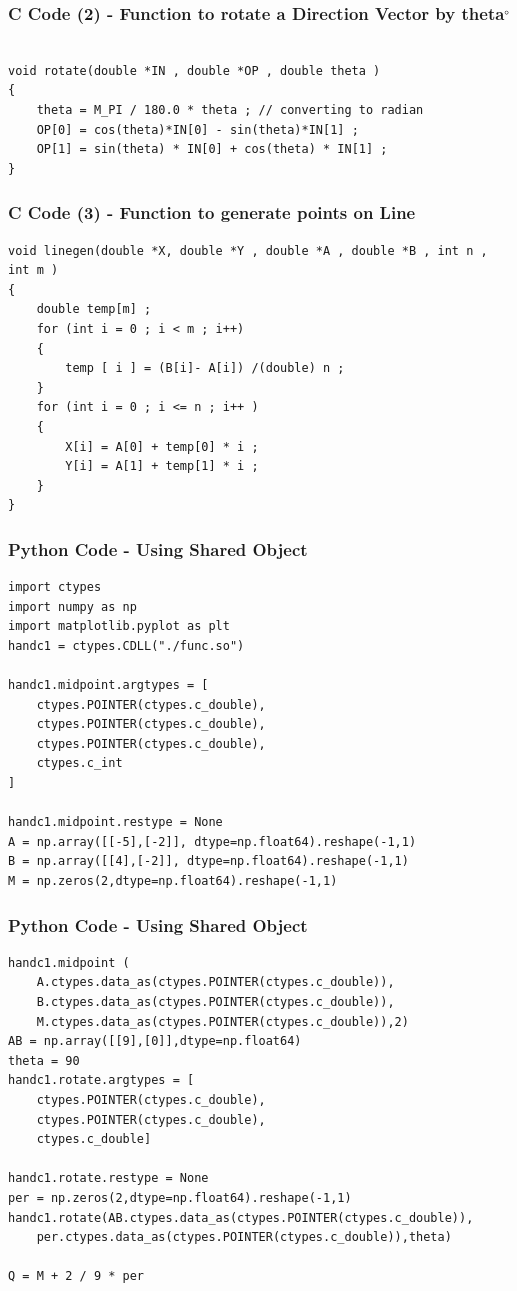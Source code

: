 \documentclass{beamer}
\begin{document}
\begin{frame}[fragile]
    \frametitle{C Code (2) - Function to rotate a Direction Vector by theta$\degree$}
    \begin{lstlisting}

void rotate(double *IN , double *OP , double theta )
{
    theta = M_PI / 180.0 * theta ; // converting to radian
    OP[0] = cos(theta)*IN[0] - sin(theta)*IN[1] ; 
    OP[1] = sin(theta) * IN[0] + cos(theta) * IN[1] ; 
}

    \end{lstlisting}
\end{frame}



\begin{frame}[fragile]
    \frametitle{C Code (3) - Function to generate points on Line }
    \begin{lstlisting}
void linegen(double *X, double *Y , double *A , double *B , int n , int m )
{
    double temp[m] ; 
    for (int i = 0 ; i < m ; i++)
    {
        temp [ i ] = (B[i]- A[i]) /(double) n ; 
    }
    for (int i = 0 ; i <= n ; i++ )
    {
        X[i] = A[0] + temp[0] * i ; 
        Y[i] = A[1] + temp[1] * i ;
    }
}

\end{lstlisting}
\end{frame}

\begin{frame}[fragile]
    \frametitle{Python Code - Using Shared Object}
    \begin{lstlisting}
import ctypes
import numpy as np
import matplotlib.pyplot as plt
handc1 = ctypes.CDLL("./func.so")

handc1.midpoint.argtypes = [
    ctypes.POINTER(ctypes.c_double),
    ctypes.POINTER(ctypes.c_double),
    ctypes.POINTER(ctypes.c_double),
    ctypes.c_int
]

handc1.midpoint.restype = None
A = np.array([[-5],[-2]], dtype=np.float64).reshape(-1,1)
B = np.array([[4],[-2]], dtype=np.float64).reshape(-1,1)
M = np.zeros(2,dtype=np.float64).reshape(-1,1)

\end{lstlisting}
\end{frame}

\begin{frame}[fragile]
    \frametitle{Python Code - Using Shared Object}
    \begin{lstlisting} 
handc1.midpoint (
    A.ctypes.data_as(ctypes.POINTER(ctypes.c_double)),
    B.ctypes.data_as(ctypes.POINTER(ctypes.c_double)),
    M.ctypes.data_as(ctypes.POINTER(ctypes.c_double)),2)
AB = np.array([[9],[0]],dtype=np.float64)
theta = 90
handc1.rotate.argtypes = [
    ctypes.POINTER(ctypes.c_double),
    ctypes.POINTER(ctypes.c_double),
    ctypes.c_double]

handc1.rotate.restype = None
per = np.zeros(2,dtype=np.float64).reshape(-1,1)
handc1.rotate(AB.ctypes.data_as(ctypes.POINTER(ctypes.c_double)),
    per.ctypes.data_as(ctypes.POINTER(ctypes.c_double)),theta)

Q = M + 2 / 9 * per


\end{lstlisting}
\end{frame}
\end{document}
